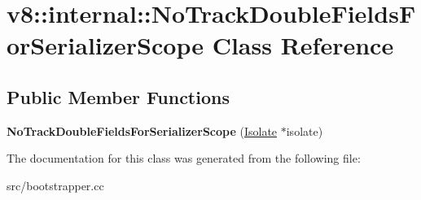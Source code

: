 \hypertarget{classv8_1_1internal_1_1_no_track_double_fields_for_serializer_scope}{}\section{v8\+:\+:internal\+:\+:No\+Track\+Double\+Fields\+For\+Serializer\+Scope Class Reference}
\label{classv8_1_1internal_1_1_no_track_double_fields_for_serializer_scope}
\subsection*{Public Member Functions}
\begin{DoxyCompactItemize}
\item 
\hypertarget{classv8_1_1internal_1_1_no_track_double_fields_for_serializer_scope_af5b6f9405be00be661ae1e644728f0fe}{}{\bfseries No\+Track\+Double\+Fields\+For\+Serializer\+Scope} (\hyperlink{classv8_1_1internal_1_1_isolate}{Isolate} $\ast$isolate)\label{classv8_1_1internal_1_1_no_track_double_fields_for_serializer_scope_af5b6f9405be00be661ae1e644728f0fe}

\end{DoxyCompactItemize}


The documentation for this class was generated from the following file\+:\begin{DoxyCompactItemize}
\item 
src/bootstrapper.\+cc\end{DoxyCompactItemize}
